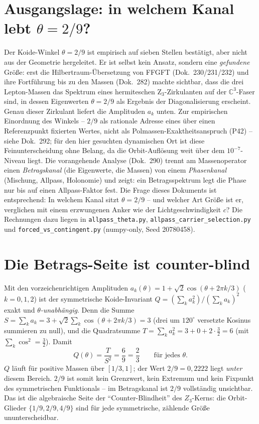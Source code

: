 \section{Ausgangslage: in welchem Kanal lebt $\theta=2/9$?}
Der Koide-Winkel $\theta=2/9$ ist empirisch auf sieben Stellen bestätigt, aber nicht aus der
Geometrie hergeleitet. Er ist selbst kein Ansatz, sondern eine \emph{gefundene} Größe: erst die
Hilbertraum-Übersetzung von FFGFT (Dok.~230/231/232) und ihre Fortführung bis zu den Massen
(Dok.~282) machte sichtbar, dass die drei Lepton-Massen das Spektrum eines hermiteschen
Z$_3$-Zirkulanten auf der $\mathbb{C}^3$-Faser sind, in dessen Eigenwerten $\theta=2/9$ als
Ergebnis der Diagonalisierung erscheint. Genau dieser Zirkulant liefert die Amplituden $a_k$
unten. Zur empirischen Einordnung des Winkels -- $2/9$ als rationale Adresse eines über einen
Referenzpunkt fixierten Wertes, nicht als Polmassen-Exaktheitsanspruch (P42) -- siehe Dok.~292;
für den hier gesuchten dynamischen Ort ist diese Feinunterscheidung ohne Belang, da die
Orbit-Auflösung weit über dem $10^{-7}$-Niveau liegt. Die vorangehende Analyse (Dok.~290) trennt
am Massenoperator einen
\emph{Betragskanal} (die Eigenwerte, die Massen) von einem \emph{Phasenkanal} (Mischung,
Allpass, Holonomie) und zeigt: ein Betragsspektrum legt die Phase nur bis auf einen
Allpass-Faktor fest. Die Frage dieses Dokuments ist entsprechend: In welchem Kanal sitzt
$\theta=2/9$ -- und welcher Art Größe ist er, verglichen mit einem erzwungenen Anker wie der
Lichtgeschwindigkeit $c$? Die Rechnungen dazu liegen in \texttt{allpass\_theta.py},
\texttt{allpass\_carrier\_selection.py} und \texttt{forced\_vs\_contingent.py} (numpy-only,
Seed 20780458).

\section{Die Betrags-Seite ist counter-blind}
Mit den vorzeichenrichtigen Amplituden $a_k(\theta)=1+\sqrt2\cos(\theta+2\pi k/3)$ ($k=0,1,2$)
ist der symmetrische Koide-Invariant $Q=(\sum_k a_k^2)/(\sum_k a_k)^2$ exakt und
\emph{$\theta$-unabhängig}. Denn die Summe $S=\sum_k a_k=3+\sqrt2\sum_k\cos(\theta+2\pi k/3)=3$
(drei um $120^\circ$ versetzte Kosinus summieren zu null), und die Quadratsumme
$T=\sum_k a_k^2=3+0+2\cdot\tfrac32=6$ (mit $\sum_k\cos^2=\tfrac32$). Damit
\[
Q(\theta)=\frac{T}{S^2}=\frac{6}{9}=\frac{2}{3}\qquad\text{für jedes }\theta.
\]
$Q$ läuft für positive Massen über $[1/3,1]$; der Wert $2/9=0{,}2222$ liegt \emph{unter} diesem
Bereich. $2/9$ ist somit kein Grenzwert, kein Extremum und kein Fixpunkt des symmetrischen
Funktionals -- im Betragskanal ist $2/9$ vollständig unsichtbar. Das ist die algebraische Seite
der \enquote{Counter-Blindheit} des $Z_3$-Kerns: die Orbit-Glieder $\{1/9,2/9,4/9\}$ sind für
jede symmetrische, zählende Größe ununterscheidbar.

